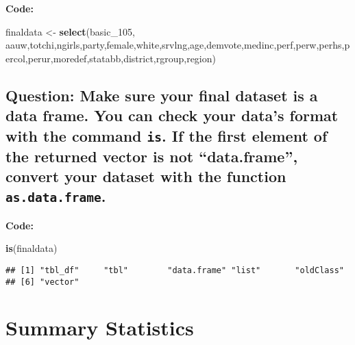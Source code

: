 \documentclass[
]{article}
\newenvironment{Shaded}{\begin{snugshade}}{\end{snugshade}}
\newcommand{\FunctionTok}[1]{\textcolor[rgb]{0.13,0.29,0.53}{\textbf{#1}}}
\newcommand{\NormalTok}[1]{#1}
\newcommand{\OtherTok}[1]{\textcolor[rgb]{0.56,0.35,0.01}{#1}}
\begin{document}
\textbf{Code:}

\begin{Shaded}
\begin{Highlighting}[]
\NormalTok{finaldata }\OtherTok{\textless{}{-}} \FunctionTok{select}\NormalTok{(basic\_105, aauw,totchi,ngirls,party,female,white,srvlng,age,demvote,medinc,perf,perw,perhs,percol,perur,moredef,statabb,district,rgroup,region)}
\end{Highlighting}
\end{Shaded}

\clearpage

\hypertarget{question-make-sure-your-final-dataset-is-a-data-frame.-you-can-check-your-datas-format-with-the-command-is.-if-the-first-element-of-the-returned-vector-is-not-data.frame-convert-your-dataset-with-the-function-as.data.frame.}{%
\subsection{\texorpdfstring{Question: Make sure your final dataset is a
data frame. You can check your data's format with the command
\texttt{is}. If the first element of the returned vector is not
``data.frame'', convert your dataset with the function
\texttt{as.data.frame}.}{Question: Make sure your final dataset is a data frame. You can check your data's format with the command is. If the first element of the returned vector is not ``data.frame'', convert your dataset with the function as.data.frame.}}\label{question-make-sure-your-final-dataset-is-a-data-frame.-you-can-check-your-datas-format-with-the-command-is.-if-the-first-element-of-the-returned-vector-is-not-data.frame-convert-your-dataset-with-the-function-as.data.frame.}}

\textbf{Code:}

\begin{Shaded}
\begin{Highlighting}[]
\FunctionTok{is}\NormalTok{(finaldata)}
\end{Highlighting}
\end{Shaded}

\begin{verbatim}
## [1] "tbl_df"     "tbl"        "data.frame" "list"       "oldClass"  
## [6] "vector"
\end{verbatim}

\clearpage

\hypertarget{summary-statistics}{%
\section{Summary Statistics}\label{summary-statistics}}
\end{document}
